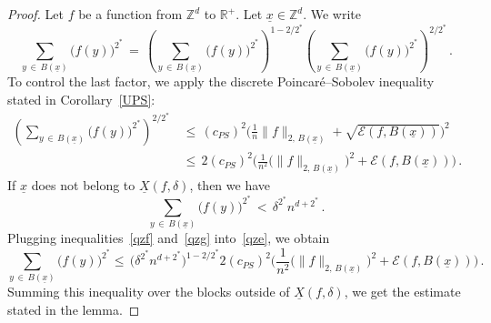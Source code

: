 \documentclass[AHL, Unicode, longabstracts, published]{cedram}
\newcommand{\XX}{{\underline{X}}}
\newcommand{\xx}{{\underline{x}}}
\newcommand*\Zd {{\mathbb Z^d}}
\newcommand*\R{\mathbb{R}}
\newcommand{\cE}{\mathcal{E}}
\begin{document}
\begin{proof}
Let $f$ be a function from $\Zd$ to $\R^+$. Let $\xx\in\Zd$. We write
\begin{equation}\label{qze}
\sum_{y\,\in\,B(\xx)}\big(f(y)\big)^{2^*}\,=\,
\left(\sum_{y\,\in\,B(\xx)}\big(f(y)\big)^{2^*}\right)^{1-2/2^*}
\left(\sum_{y\,\in\,B(\xx)}\big(f(y)\big)^{2^*}\right)^{2/2^*}\,.
\end{equation}
To control the last factor, we apply the discrete Poincaré--Sobolev inequality stated in Corollary~\ref{UPS}:
\begin{equation}\label{qzf}
\begin{aligned}
\left(\sum_{y\,\in\,B(\xx)}\big(f(y)\big)^{2^*}\right)^{2/2^*} &\,\leq\, (c_{PS})^2\bigg(\frac{1}{n}
\|f\|_{2,\,B(\xx)}+\sqrt{\cE(f,B(\xx))}\bigg)^2\\
&\,\leq\, 2(c_{PS})^2\bigg(\frac{1}{n^2}
\big(\|f\|_{2,\,B(\xx)}\big)^2+{\cE(f,B(\xx))}\bigg)
\,.
\end{aligned}
\end{equation}
If $\xx$ does not belong to $\XX(f,\delta)$, then we have
\begin{equation}\label{qzg}
\sum_{y\,\in\,B(\xx)}\big(f(y)\big)^{2^*}\,<\,
\delta^{2^*} n^{d+2^*}\,.
\end{equation}
Plugging inequalities~\eqref{qzf} and~\eqref{qzg} into~\eqref{qze}, we obtain
\[
\sum_{y\,\in\,B(\xx)}\!
\big(f(y)\big)^{2^*}\!\leq\,
\big(
\delta^{2^*} n^{d+2^*}
\big)^{1-2/2^*} 2(c_{PS})^2\bigg(\frac{1}{n^2}
\big(\|f\|_{2,\,B(\xx)}\big)^2+{\cE(f,B(\xx))}\bigg)
\,.
\]
Summing this inequality over the blocks outside of $\XX(f,\delta)$, we get the estimate stated in the lemma.
\end{proof}
\end{document}
